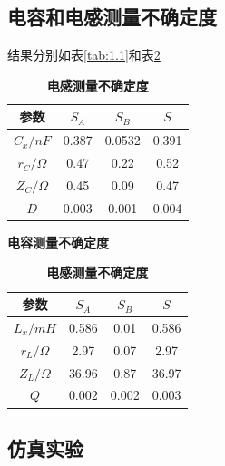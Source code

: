 \documentclass[12pt,a4paper,UTF8]{ctexart}
\begin{document}
\subsection*{电容和电感测量不确定度}
结果分别如表\ref{tab:1.1}和表\ref{tab:1.2}
\begin{table}[htbp]
	\centering
	\begin{minipage}{0.45\linewidth}
		\begin{tabular}{cccc}
            \toprule
            参数 &$S_A$ &$S_B$ &$S$   \\
            \midrule
            $C_x/ nF$    &0.387   &0.0532  &0.391 \\
            $r_C/ \Omega$   &0.47   &0.22   &0.52 \\
            $Z_C/ \Omega$   &0.45   &0.09   &0.47 \\
            $D$             &0.003  &0.001  &0.004 \\
            \bottomrule
        \end{tabular}
        \caption{\textbf{电容测量不确定度}}
		\label{tab:1.1}
	\end{minipage}
	\begin{minipage}{0.45\linewidth}
		\begin{tabular}{cccc}
            \toprule
            参数 &$S_A$ &$S_B$ &$S$   \\
            \midrule
            $L_x/ mH$    &0.586  &0.01   &0.586 \\
            $r_L/ \Omega$   &2.97   &0.07   &2.97 \\
            $Z_L/ \Omega$   &36.96   &0.87   &36.97 \\
            $Q$             &0.002  &0.002  &0.003 \\
            \bottomrule
        \end{tabular}
        \caption{\textbf{电感测量不确定度}}
        \label{tab:1.2}
	\end{minipage}
\end{table}

\subsection*{仿真实验}
\end{document}
